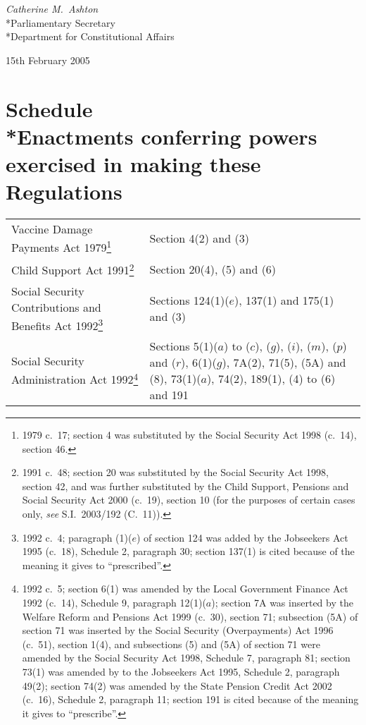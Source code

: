 \documentclass[12pt,a4paper]{article}
\begin{document}
{\raggedleft
\emph{Catherine M.~Ashton}\\*Parliamentary Secretary\\*Department for Constitutional Affairs

}


15th February 2005

\small

\part[Schedule --- Enactments conferring powers exercised in making these Regulations]{Schedule\\*Enactments conferring powers exercised in making these Regulations}

{\noindent{}
\begin{longtable}{p{94.09729pt}p{271.91016pt}}
\hline
\endhead
\hline
\endlastfoot
Vaccine Damage Payments Act 1979\footnote{1979 c.\ 17; section 4 was substituted by the Social Security Act 1998 (c.\ 14), section 46.}	&Section 4(2) and (3)\\
Child Support Act 1991\footnote{1991 c.\ 48; section 20 was substituted by the Social Security Act 1998, section 42, and was further substituted by the Child Support, Pensions and Social Security Act 2000 (c.\ 19), section 10 (for the purposes of certain cases only, \emph{see} S.I.\ 2003/192 (C.\ 11)).}	&Section 20(4), (5) and (6)\\
Social Security Contributions and Benefits Act 1992\footnote{1992 c.\ 4; paragraph (1)($e$)  of section 124 was added by the Jobseekers Act 1995 (c.\ 18), Schedule 2, paragraph 30; section 137(1) is cited because of the meaning it gives to “prescribed”.}	&Sections 124(1)($e$), 137(1) and 175(1) and (3)\\
Social Security Administration Act 1992\footnote{1992 c.\ 5; section 6(1) was amended by the Local Government Finance Act 1992 (c.\ 14), Schedule 9, paragraph 12(1)($a$); section 7A was inserted by the Welfare Reform and Pensions Act 1999 (c.\ 30), section 71; subsection (5A) of section 71 was inserted by the Social Security (Overpayments) Act 1996 (c.\ 51), section 1(4), and subsections (5) and (5A) of section 71 were amended by the Social Security Act 1998, Schedule 7, paragraph 81; section 73(1) was amended by to the Jobseekers Act 1995, Schedule 2, paragraph 49(2); section 74(2) was amended by the State Pension Credit Act 2002 (c.\ 16), Schedule 2, paragraph 11; section 191 is cited because of the meaning it gives to “prescribe”.}	&Sections 5(1)($a$)  to ($c$), ($g$), ($i$), ($m$), ($p$)  and ($r$), 6(1)($g$), 7A(2), 71(5), (5A) and (8), 73(1)($a$), 74(2), 189(1), (4) to (6) and 191\\

\end{longtable}}
\end{document}

